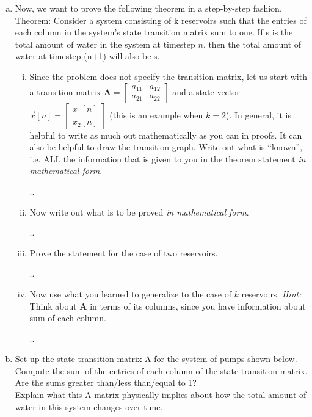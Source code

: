 \documentclass[11pt]{article}
\def\A{\textbf{A}} %
\begin{document}
\begin{enumerate}
\begin{enumerate}[(a)]
            \item Now, we want to prove the following theorem in a step-by-step fashion.\\Theorem: Consider a system consisting of k reservoirs such that the entries of each column in the system’s state transition matrix sum to one. If s is the total amount of water in the system at timestep $n$, then the total amount of water at timestep (n+1) will also be s.
            \begin{enumerate}[i.]
                \item 
Since the problem does not specify the transition matrix, let us start with a transition matrix
$\A = \begin{bmatrix}
        a_{11} & a_{12} \\
        a_{21} & a_{22}
    \end{bmatrix}$ and a state vector $\vec x[n] = \begin{bmatrix}
        x_1[n]\\
        x_2[n]
    \end{bmatrix}$ (this is an example when $k = 2$). In general, it is helpful to write as much out mathematically as you can in proofs. It can also be helpful to draw the transition graph. Write out what is “known”, i.e. ALL the information that is given to you in the theorem statement \textit{in mathematical form}.
    \begin{Answer}
        ..
    \end{Answer}
    \item Now write out what is to be proved \textit{in mathematical form}.
    \begin{Answer}
        ..
    \end{Answer}
    \item Prove the statement for the case of two reservoirs.
    \begin{Answer}
        ..
    \end{Answer}
    \item Now use what you learned to generalize to the case of $k$ reservoirs. \textit{Hint:} Think about $\A$ in terms of its columns, since you have information about sum of each column.
    \begin{Answer}
        ..
    \end{Answer}
            \end{enumerate}
            
            \newpage
            \item Set up the state transition matrix A for the system of pumps shown below. Compute the sum of the entries of each column of the state transition matrix. Are the sums greater than/less than/equal to 1?\\Explain what this A matrix physically implies about how the total amount of water in this system changes over time.
            

\end{enumerate}
\end{enumerate}
\end{document}
